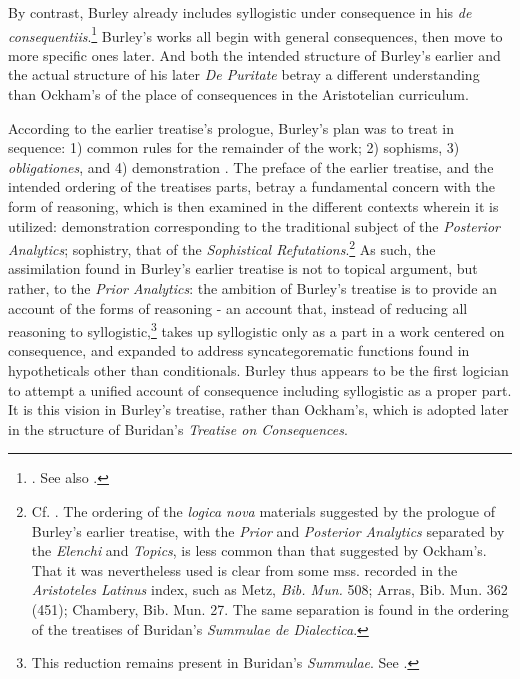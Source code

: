 \documentclass[]{article}
\begin{document}
By contrast, Burley already includes syllogistic under consequence in his \textit{de consequentiis}.\footnote{\cite[pp. 131-132, par. 82-85]{Green-Pedersen1980b}. See also \cite[p. 219.19-32]{BurleyDPAL}.} Burley's works all begin with general consequences, then move to more specific ones later. And both the intended structure of Burley's earlier and the actual structure of his later \textit{De Puritate} betray a different understanding than Ockham's of the place of consequences in the Aristotelian curriculum.

According to the earlier treatise's prologue, Burley's plan was to treat in sequence: 1) common rules for the remainder of the work; 2) sophisms, 3) \textit{obligationes}, and 4) demonstration \cite[p. 199]{BurleyDPAL}. The preface of the earlier treatise, and the intended ordering of the treatises parts, betray a fundamental concern with the form of reasoning, which is then examined in the different contexts wherein it is utilized: demonstration corresponding to the traditional subject of the \textit{Posterior Analytics}; sophistry, that of the \textit{Sophistical Refutations}.\footnote{Cf. \cite[prol.]{AquinasPA}. The ordering of the \textit{logica nova} materials suggested by the prologue of Burley's earlier treatise, with the \textit{Prior} and \textit{Posterior Analytics} separated by the \textit{Elenchi} and \textit{Topics}, is less common than that suggested by Ockham's. That it was nevertheless used is clear from some mss. recorded in the \textit{Aristoteles Latinus} index, such as Metz, \textit{Bib. Mun.} 508; Arras, Bib. Mun. 362 (451); Chambery, Bib. Mun. 27. The same separation is found in the ordering of the treatises of Buridan's \textit{Summulae de Dialectica}.} As such, the assimilation found in Burley's earlier treatise is not to topical argument, but rather, to the \textit{Prior Analytics}: the ambition of Burley's treatise is to provide an account of the forms of reasoning - an account that, instead of reducing all reasoning to syllogistic,\footnote{This reduction remains present in Buridan's \textit{Summulae}. See \cite[6.1.5, pp. 398-400]{BuridanKlimaSD}.} takes up syllogistic only as a part in a work centered on consequence, and expanded to address syncategorematic functions found in hypotheticals other than conditionals. Burley thus appears to be the first logician to attempt a unified account of consequence including syllogistic as a proper part. It is this vision in Burley's treatise, rather than Ockham's, which is adopted later in the structure of Buridan's \textit{Treatise on Consequences}.
\end{document}
